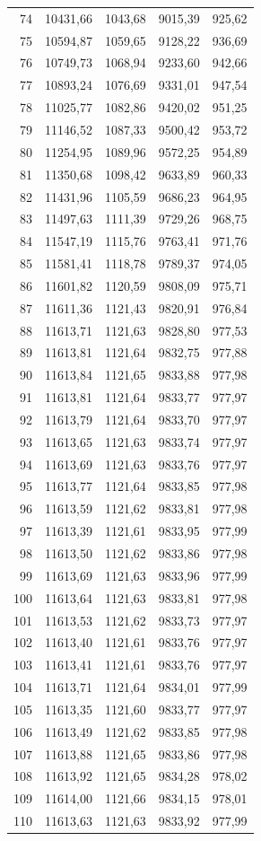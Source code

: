 \begin{small}
\begin{longtable}{rrrrr}
74 & 10431,66 & 1043,68 & 9015,39 & 925,62 \\
75 & 10594,87 & 1059,65 & 9128,22 & 936,69 \\
76 & 10749,73 & 1068,94 & 9233,60 & 942,66 \\
77 & 10893,24 & 1076,69 & 9331,01 & 947,54 \\
78 & 11025,77 & 1082,86 & 9420,02 & 951,25 \\
79 & 11146,52 & 1087,33 & 9500,42 & 953,72 \\
80 & 11254,95 & 1089,96 & 9572,25 & 954,89 \\
81 & 11350,68 & 1098,42 & 9633,89 & 960,33 \\
82 & 11431,96 & 1105,59 & 9686,23 & 964,95 \\
83 & 11497,63 & 1111,39 & 9729,26 & 968,75 \\
84 & 11547,19 & 1115,76 & 9763,41 & 971,76 \\
85 & 11581,41 & 1118,78 & 9789,37 & 974,05 \\
86 & 11601,82 & 1120,59 & 9808,09 & 975,71 \\
87 & 11611,36 & 1121,43 & 9820,91 & 976,84 \\
88 & 11613,71 & 1121,63 & 9828,80 & 977,53 \\
89 & 11613,81 & 1121,64 & 9832,75 & 977,88 \\
90 & 11613,84 & 1121,65 & 9833,88 & 977,98 \\
91 & 11613,81 & 1121,64 & 9833,77 & 977,97 \\
92 & 11613,79 & 1121,64 & 9833,70 & 977,97 \\
93 & 11613,65 & 1121,63 & 9833,74 & 977,97 \\
94 & 11613,69 & 1121,63 & 9833,76 & 977,97 \\
95 & 11613,77 & 1121,64 & 9833,85 & 977,98 \\
96 & 11613,59 & 1121,62 & 9833,81 & 977,98 \\
97 & 11613,39 & 1121,61 & 9833,95 & 977,99 \\
98 & 11613,50 & 1121,62 & 9833,86 & 977,98 \\
99 & 11613,69 & 1121,63 & 9833,96 & 977,99 \\
100 & 11613,64 & 1121,63 & 9833,81 & 977,98 \\
101 & 11613,53 & 1121,62 & 9833,73 & 977,97 \\
102 & 11613,40 & 1121,61 & 9833,76 & 977,97 \\
103 & 11613,41 & 1121,61 & 9833,76 & 977,97 \\
104 & 11613,71 & 1121,64 & 9834,01 & 977,99 \\
105 & 11613,35 & 1121,60 & 9833,77 & 977,97 \\
106 & 11613,49 & 1121,62 & 9833,85 & 977,98 \\
107 & 11613,88 & 1121,65 & 9833,86 & 977,98 \\
108 & 11613,92 & 1121,65 & 9834,28 & 978,02 \\
109 & 11614,00 & 1121,66 & 9834,15 & 978,01 \\
110 & 11613,63 & 1121,63 & 9833,92 & 977,99 \\
\end{longtable}
\end{small}
